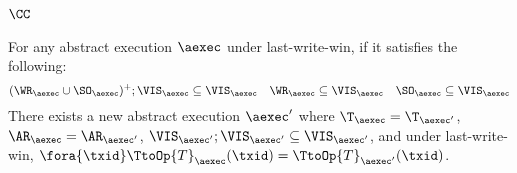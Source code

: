 \subsubsection{\( \CC \)}

\label{sec:sound-complete-cc}

\begin{lemma}
    \label{lem:aexec-spec-cc}
    For any abstract execution \( \aexec \) under last-write-win, if it satisfies the following:
    \[
        (\WR_\aexec \cup \SO_\aexec)^{+} ; \VIS_\aexec \subseteq \VIS_\aexec \quad \WR_\aexec \subseteq \VIS_\aexec \quad \SO_\aexec \subseteq \VIS_\aexec
    \]
    There exists a new abstract execution \( \aexec' \) where \( \T_\aexec = \T_{\aexec'} \), \( \AR_\aexec = \AR_{\aexec'} \),
    \( \VIS_{\aexec'} ; \VIS_{\aexec'} \subseteq \VIS_{\aexec'} \), and
    under last-write-win, \( \fora{\txid} \TtoOp{T}_{\aexec}(\txid) = \TtoOp{T}_{\aexec'}(\txid) \).
\end{lemma}

